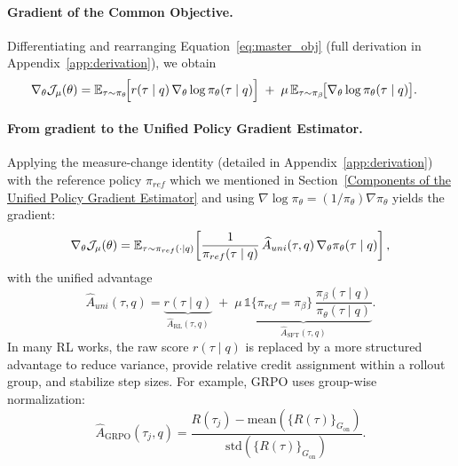 \paragraph{Gradient of the Common Objective.}
Differentiating and rearranging Equation~\ref{eq:master_obj} (full derivation in Appendix~\ref{app:derivation}), we obtain
\begin{equation}
\label{eq:master_grad_pi_measure}
\begin{aligned}
\nabla_\theta \mathcal{J}_{\mu}(\theta)
&= \mathbb{E}_{\tau\sim \pi_\theta}\!\Big[r(\tau\mid q)\,\nabla_\theta \log \pi_\theta(\tau\mid q)\Big]
\;+\; \mu\,\mathbb{E}_{\tau\sim \pi_\beta}\!\big[\nabla_\theta \log \pi_\theta(\tau\mid q)\big].
\end{aligned}
\end{equation}

\paragraph{From gradient to the Unified Policy Gradient Estimator.}
Applying the measure-change identity (detailed in Appendix~\ref{app:derivation}) with the reference policy $\pi_{ref}$ which we mentioned in Section~\ref{Components of the Unified Policy Gradient Estimator} and using $\nabla \log \pi_\theta=(1/\pi_\theta)\nabla \pi_\theta$ yields the gradient:
\begin{equation}
\label{eq:upge_form}
\nabla_\theta \mathcal{J}_{\mu}(\theta)
=
\mathbb{E}_{\tau\sim \pi_{ref}(\cdot\mid q)}
\!\left[
\frac{1}{\pi_{ref}(\tau\mid q)}\,
\widehat{A}_{uni}(\tau,q)\,
\nabla_\theta \pi_\theta(\tau\mid q)
\right],
\end{equation}
 with the unified advantage
\begin{equation}
\label{eq:A_uni}
\widehat{A}_{uni}(\tau,q)
=
\underbrace{r(\tau\mid q)}_{\widehat{A}_{\mathrm{RL}}(\tau,q)}
\;+\;
\underbrace{\mu\,\mathbb{1}\{\pi_{ref}=\pi_\beta\}\,\frac{\pi_\beta(\tau\mid q)}{\pi_\theta(\tau\mid q)}}_{\widehat{A}_{\mathrm{SFT}}(\tau,q)}.
\end{equation}
In many RL works, the raw score $r(\tau\mid q)$ is replaced by a more structured advantage to reduce variance, provide relative credit assignment within a rollout group, and stabilize step sizes. For example, GRPO uses group-wise normalization:
\begin{equation}
\widehat{A}_{\mathrm{GRPO}}(\tau_j,q) = \frac{R(\tau_j)-\mathrm{mean}(\{R(\tau)\}_{G_{\mathrm{on}}})}{\mathrm{std}(\{R(\tau)\}_{G_{\mathrm{on}}})}.
\end{equation}

